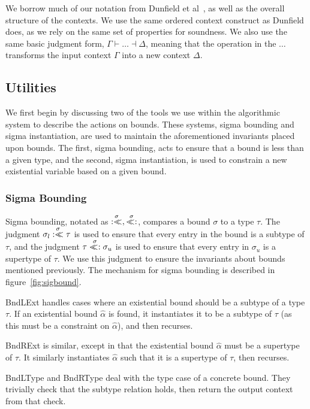 \documentclass{sig-alternate}
\newcommand{\botbound}{\sigma_{l}}
\newcommand{\topbound}{\sigma_{u}}
\newcommand{\sigbndl}{\overset{\sigma}{:<\hspace{-5px}<}}
\newcommand{\sigbndr}{\overset{\sigma}{<\hspace{-5px}<:}}
\begin{document}
We borrow much of our notation from Dunfield et al~\cite{Dunfield:2013:CEB:2544174.2500582}, as well as the overall structure of the contexts. We use the same ordered context construct as Dunfield does, as we rely on the same set of properties for soundness. We also use the same basic judgment form, $\Gamma \vdash \ldots \dashv \Delta$, meaning that the operation in the $\ldots$ transforms the input context $\Gamma$ into a new context $\Delta$.

\subsection{Utilities}

We first begin by discussing two of the tools we use within the algorithmic system to describe the actions on bounds. These systems, sigma bounding and sigma instantiation, are used to maintain the aforementioned invariants placed upon bounds. The first, sigma bounding, acts to ensure that a bound is less than a given type, and the second, sigma instantiation, is used to constrain a new existential variable based on a given bound.


\subsubsection{Sigma Bounding}
Sigma bounding, notated as $\sigbndl,\sigbndr$, compares a bound $\sigma$ to a type $\tau$. The judgment $\botbound \sigbndl \tau$ is used to ensure that every entry in the bound is a subtype of $\tau$, and the judgment $\tau \sigbndr \topbound$ is used to ensure that every entry in $\topbound$ is a supertype of $\tau$. We use this judgment to ensure the invariants about bounds mentioned previously. The mechanism for sigma bounding is described in figure~\ref{fig:sigbound}.

BndLExt handles cases where an existential bound should be a subtype of a type $\tau$. If an existential bound $\hat{\alpha}$ is found, it instantiates it to be a subtype of $\tau$ (as this must be a constraint on $\hat{\alpha}$), and then recurses.

BndRExt is similar, except in that the existential bound $\hat{\alpha}$ must be a supertype of $\tau$. It similarly instantiates $\hat{\alpha}$ such that it is a supertype of $\tau$, then recurses.

BndLType and BndRType deal with the type case of a concrete bound. They trivially check that the subtype relation holds, then return the output context from that check.
\end{document}
